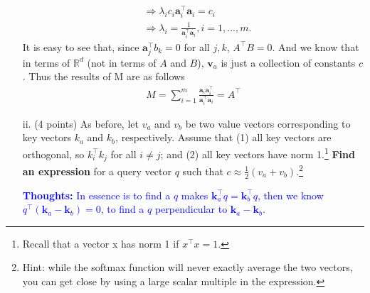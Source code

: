 \documentclass[letterpaper,12pt]{article}
\begin{document}
\begin{itemize}
{\begin{equation*}
\begin{aligned}
			&\Rightarrow \lambda_i c_i \mathbf{a}_i^\top \mathbf{a}_i = c_i \\
			&\Rightarrow \lambda_i = \frac{1}{\mathbf{a}_i^\top \mathbf{a}_i}, i=1,\ldots, m.
		\end{aligned}
		\label{eq: M_solution}
	\end{equation*}
	It is easy to see that, since $\mathbf{a}_j^\top b_k = 0$ for all $j, k$, $A^\top B = 0$. And we know that in terms of $\mathbb{R}^d$ (not in terms of $A$ and $B$), $\mathbf{v}_a$ is just a collection of constants $c$. Thus the results of M are as follows
	\begin{equation*}
		\begin{aligned}
			M = \sum_{i=1}^{m}\frac{\mathbf{a}_i \mathbf{a}_i^\top}{\mathbf{a}_i^\top \mathbf{a}_i} = A^\top
		\end{aligned}
	\label{eq: M_result}
 	\end{equation*}
	} 
			
			
	\item[ii.]
	(4 points) As before, let $v_a$ and $v_b$ be two value vectors corresponding to key vectors $k_a$ and $k_b$, respectively. Assume that (1) all key vectors are orthogonal, so $k_i^\top k_j$ for all $i \neq j$; and (2) all key vectors have norm 1.\footnote{Recall that a vector x has norm 1 if $x^{\top}x = 1$.} \textbf{Find an expression} for a query vector $q$ such that $c \approx \frac{1}{2}(v_a +v_b)$.\footnote{Hint: while the softmax function will never exactly average the two vectors, you can get close by using a large scalar multiple in the expression.}
	
	\textcolor{blue}{\textbf{Thoughts:} In essence is to find a $q$ makes $\mathbf{k}_a^\top q = \mathbf{k}_b^\top q$, then we know $q^\top (\mathbf{k}_a - \mathbf{k}_b) = 0$, to find a $q$ perpendicular to $\mathbf{k}_a - \mathbf{k}_b$}.
	

\end{itemize}
\end{document}
